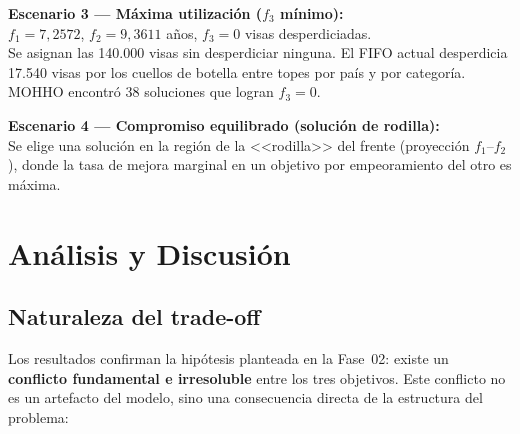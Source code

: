 \documentclass[12pt,letterpaper]{article}
\begin{document}
\begin{examplebox}
\textbf{Escenario 3 --- Máxima utilización ($f_3$ mínimo):}\\
$f_1 = 7{,}2572$, $f_2 = 9{,}3611$ años, $f_3 = 0$ visas desperdiciadas.\\
Se asignan las 140.000 visas sin desperdiciar ninguna. El FIFO actual desperdicia 17.540 visas por los cuellos de botella entre topes por país y por categoría. MOHHO encontró 38 soluciones que logran $f_3 = 0$.
\end{examplebox}

\begin{examplebox}
\textbf{Escenario 4 --- Compromiso equilibrado (solución de rodilla):}\\
Se elige una solución en la región de la <<rodilla>> del frente (proyección $f_1$--$f_2$), donde la tasa de mejora marginal en un objetivo por empeoramiento del otro es máxima.
\end{examplebox}

\newpage
\section{Análisis y Discusión}
\label{sec:discusion}

\subsection{Naturaleza del trade-off}

Los resultados confirman la hipótesis planteada en la Fase~02: existe un \textbf{conflicto fundamental e irresoluble} entre los tres objetivos. Este conflicto no es un artefacto del modelo, sino una consecuencia directa de la estructura del problema:
\end{document}
